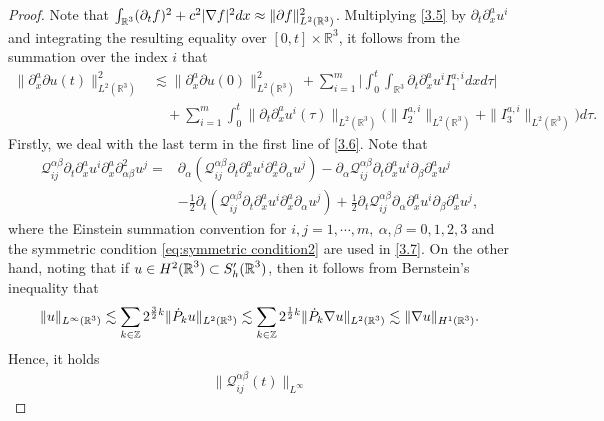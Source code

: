\documentclass[10pt,a4paper]{amsart}
\def\R{\mathop{\mathbb R\kern 0pt}\nolimits}
\def\Z{\mathop{\mathbb Z\kern 0pt}\nolimits}
\def\cQ{\mathcal Q}
\def\f{\frac}
\def\ls{\lesssim}
\def\p{\partial}
\newcommand{\pk}{\dot{P}_k}
\begin{document}
\begin{proof}
	Note that $\int_{\R^3}(\p_t f)^2 + c^2|\nabla f|^2 dx \approx \|\partial f\|_{L^2(\mathbb{R}^3)}^2 $.
Multiplying \eqref{3.5} by $\partial_t \partial_x^a u^i$ and integrating the resulting equality over
	$[0,t] \times \mathbb{R}^3$, it follows from the summation over the index $i$ that
	\begin{equation}\label{3.6}
		\begin{aligned}
			\|\partial_x^a\partial  u(t)\|_{L^2(\mathbb{R}^3)}^2 &\lesssim \| \partial_x^a\partial u(0)\|_{L^2(\mathbb{R}^3)}^2
+ \sum_{i=1}^{m}\big| \int_0^t \int_{\mathbb{R}^3} \partial_t \partial_x^a u^i I_1^{a,i} dx d\tau \big| \\
			&\quad +\sum_{i=1}^{m} \int_0^t \|\partial_t \partial_x^a u^i(\tau)\|_{L^2(\mathbb{R}^3)} \big(\|I_2^{a,i}\|_{L^2(\mathbb{R}^3)}+\|I_3^{a,i}\|_{L^2(\mathbb{R}^3)}\big) d\tau.
		\end{aligned}
	\end{equation}
	Firstly, we deal with the last term in the first line of \eqref{3.6}. Note that
	\begin{equation}\label{3.7}
		\begin{aligned}
			\cQ^{\alpha\beta}_{ij} \partial_t \partial_x^a u^i  \p_x^a\partial_{\alpha\beta}^2 u^j
			=&\partial_\alpha (\cQ^{\alpha\beta}_{ij} \partial_t \partial_x^a u^i  \p_x^a\partial_{\alpha} u^j)
			-\p_\alpha \cQ^{\alpha\beta}_{ij}\partial_t \partial_x^a u^i \partial_\beta \partial_x^a u^j\\
			&-\frac{1}{2} \partial_t (\cQ^{\alpha\beta}_{ij} \partial_t \partial_x^a u^i  \p_x^a\partial_{\alpha} u^j)
			+\frac{1}{2} \p_t \cQ^{\alpha\beta}_{ij}  \partial_\alpha \partial_x^a u^i \partial_\beta \partial_x^a u^j ,
		\end{aligned}
	\end{equation}
	where the Einstein summation convention for $i,j = 1,\cdots,m,\ \alpha,\beta=0,1,2,3$ and the symmetric condition \eqref{eq:symmetric condition2} are used in \eqref{3.7}. On the other hand, noting that if $u\in H^2(\R^3)\subset S'_h(\R^3)$, then it follows from Bernstein's inequality that
	\begin{equation*}
		\|u\|_{L^\infty(\R^3)}
		\ls
		\sum_{k\in\Z}2^{\f32 k}\|\pk u\|_{L^2(\R^3)}
		\ls
		\sum_{k\in\Z}2^{\f12 k}\|\pk\nabla u\|_{L^2(\R^3)}
		\ls
		\|\nabla u\|_{H^{1}(\R^3)}.
	\end{equation*}
	Hence, it holds
	\begin{equation}\label{3.8}
		\begin{aligned}
			\|\cQ^{\alpha\beta}_{ij}(t)\|_{L^\infty}

\end{aligned}
\end{equation}
\end{proof}
\end{document}
